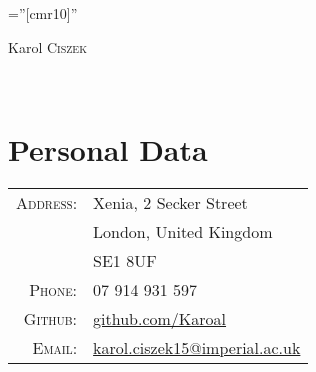 \documentclass[a4paper,10pt]{article}
\begin{document}

\pagestyle{empty} %

\font\fb=''[cmr10]'' %

\par{\centering
        {\Huge Karol \textsc{Ciszek}\\
    }\bigskip}
    \par{\\}

\section{Personal Data}
\begin{tabular}{rl}
    \textsc{Address:} & Xenia, 2 Secker Street\\
                      & London, United Kingdom\\
                      & SE1 8UF\\
    \textsc{Phone:}   & 07 914 931 597\\
    \textsc{Github:}  & \href{http://github.com/Karoal}{github.com/Karoal}\\
    \textsc{Email:}   & \href{mailto:karol.ciszek15@imperial.ac.uk}{karol.ciszek15@imperial.ac.uk}
\end{tabular}

\end{document}
